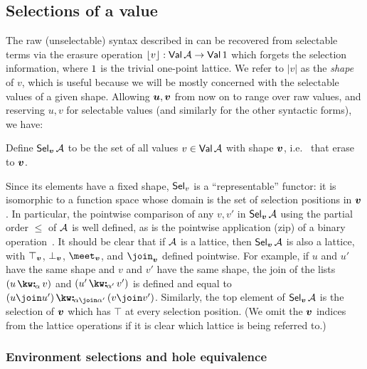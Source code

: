 \subsection{Selections of a value}

 The raw (unselectable) syntax described in  can be recovered from selectable terms via the erasure operation $\lfloor v\rfloor: \textup{\textsf{Val}}\,{\mathcal{A}} \to \textup{\textsf{Val}}\,{1}$ which forgets the selection information, where $1$ is the trivial one-point lattice. We refer to $|v|$ as the \emph{shape} of $v$, which is useful because we will be mostly concerned with the selectable values of a given shape. Allowing $\bm{u}, \bm{v}$ from now on to range over raw values, and reserving $u, v$ for selectable values (and similarly for the other syntactic forms), we have:

\begin{definition}
   Define $\textup{\textsf{Sel}}_{\bm{v}}\,{\mathcal{A}}$ to be the set of all values $v \in \textup{\textsf{Val}}\,{\mathcal{A}}$ with shape $\bm{v}$, i.e.
   ~that erase to $\bm{v}$.
\end{definition}

Since its elements have a fixed shape, $\textup{\textsf{Sel}}_{v}$ is a ``representable'' functor: it is isomorphic to a function space whose domain is the set of selection positions in $\bm{v}$. In particular, the pointwise comparison of any $v, v'$ in $\textup{\textsf{Sel}}_{\bm{v}}\,{\mathcal{A}}$ using the partial order $\leq$ of $\mathcal{A}$ is well defined, as is the pointwise application (zip) of a binary operation~\cite{gibbons17}. It should be clear that if $\mathcal{A}$ is a lattice, then $\textup{\textsf{Sel}}_{\bm{v}}\,{\mathcal{A}}$ is also a lattice, with $\top_{\bm{v}}$, $\bot_{\bm{v}}$, $\meet_{\raw{v}}$, and $\join_{\raw{v}}$ defined pointwise. For example, if $u$ and $u'$ have the same shape and $v$ and $v'$ have the same shape, the join of the lists $(\annCons{u}{v}{\alpha})$ and $(\annCons{u'}{v'}{\alpha'})$ is defined and equal to $\annCons{(u \join u')}{(v \join v')}{\alpha \join \alpha'}$. Similarly, the top element of $\textup{\textsf{Sel}}_{\bm{v}}\,{\mathcal{A}}$ is the selection of $\bm{v}$ which has $\top$ at every selection position. (We omit the $\bm{v}$ indices from the lattice operations if it is clear which lattice is being referred to.)

\subsubsection{Environment selections and hole equivalence}

